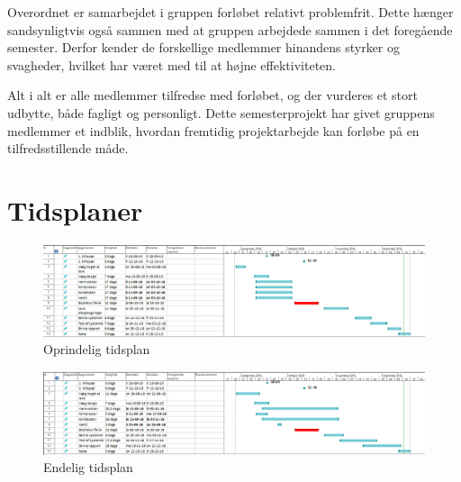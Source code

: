 \documentclass[Hovedrapport.tex]{subfiles}
\begin{document}
Overordnet er samarbejdet i gruppen forløbet relativt problemfrit. Dette hænger sandsynligtvis også sammen med at gruppen arbejdede sammen i det foregående semester. Derfor kender de forskellige medlemmer hinandens styrker og svagheder, hvilket har været med til at højne effektiviteten.

Alt i alt er alle medlemmer tilfredse med forløbet, og der vurderes et stort udbytte, både fagligt og personligt. Dette semesterprojekt har givet gruppens medlemmer et indblik, hvordan fremtidig projektarbejde kan forløbe på en tilfredsstillende måde. 
    \newpage

\section{Tidsplaner}
\begin{figure}[H]
    \centering
    \includegraphics[width=\textwidth]{Billeder/opr_time.png}
    \caption{Oprindelig tidsplan}
    \label{fig:opr_time}
\end{figure}

\begin{figure}[H]
    \centering
    \includegraphics[width=\textwidth]{Billeder/end_time.png}
    \caption{Endelig tidsplan}
    \label{fig:end_time}
\end{figure}


\end{document}
